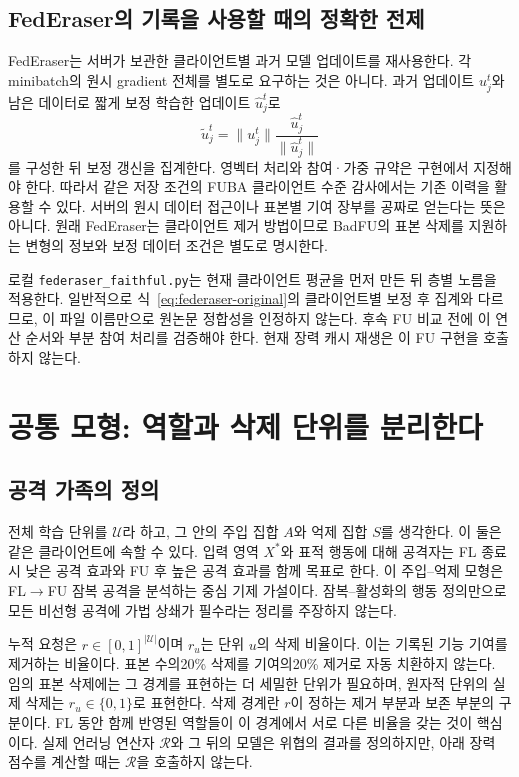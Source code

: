 \documentclass[10pt,a4paper]{article}
\begin{document}
\subsection{FedEraser의 기록을 사용할 때의 정확한 전제}
FedEraser는 서버가 보관한 클라이언트별 과거 모델 업데이트를 재사용한다\cite{federaser}.
각 minibatch의 원시 gradient 전체를 별도로 요구하는 것은 아니다.
과거 업데이트 $u_j^t$와 남은 데이터로 짧게 보정 학습한 업데이트 $\widehat u_j^t$로
\begin{equation}\label{eq:federaser-original}
 \widetilde u_j^t=\|u_j^t\|\frac{\widehat u_j^t}{\|\widehat u_j^t\|}
\end{equation}
를 구성한 뒤 보정 갱신을 집계한다. 영벡터 처리와 참여·가중 규약은 구현에서 지정해야 한다.
따라서 같은 저장 조건의 FUBA 클라이언트 수준 감사에서는 기존 이력을 활용할 수 있다.
서버의 원시 데이터 접근이나 표본별 기여 장부를 공짜로 얻는다는 뜻은 아니다.
원래 FedEraser는 클라이언트 제거 방법이므로 BadFU의 표본 삭제를 지원하는 변형의 정보와
보정 데이터 조건은 별도로 명시한다.

로컬 \texttt{federaser\_faithful.py}는 현재 클라이언트 평균을 먼저 만든 뒤 층별 노름을
적용한다. 일반적으로 식~\eqref{eq:federaser-original}의 클라이언트별 보정 후 집계와 다르므로,
이 파일 이름만으로 원논문 정합성을 인정하지 않는다. 후속 FU 비교 전에 이 연산 순서와
부분 참여 처리를 검증해야 한다. 현재 장력 캐시 재생은 이 FU 구현을 호출하지 않는다.

\section{공통 모형: 역할과 삭제 단위를 분리한다}
\subsection{공격 가족의 정의}
전체 학습 단위를 $\mathcal U$라 하고, 그 안의 주입 집합 $A$와 억제 집합 $S$를 생각한다.
이 둘은 같은 클라이언트에 속할 수 있다. 입력 영역 $X^*$와 표적 행동에 대해
공격자는 FL 종료 시 낮은 공격 효과와 FU 후 높은 공격 효과를 함께 목표로 한다.
이 주입--억제 모형은 FL$\to$FU 잠복 공격을 분석하는 중심 기제 가설이다.
잠복--활성화의 행동 정의만으로 모든 비선형 공격에 가법 상쇄가 필수라는 정리를 주장하지 않는다.

누적 요청은 $r\in[0,1]^{|\mathcal U|}$이며 $r_u$는 단위 $u$의 삭제 비율이다.
이는 기록된 기능 기여를 제거하는 비율이다. 표본 수의20\% 삭제를 기여의20\% 제거로
자동 치환하지 않는다. 임의 표본 삭제에는 그 경계를 표현하는 더 세밀한 단위가 필요하며,
원자적 단위의 실제 삭제는 $r_u\in\{0,1\}$로 표현한다.
삭제 경계란 $r$이 정하는 제거 부분과 보존 부분의 구분이다.
FL 동안 함께 반영된 역할들이 이 경계에서 서로 다른 비율을 갖는 것이 핵심이다.
실제 언러닝 연산자 $\mathcal R$와 그 뒤의 모델은 위협의 결과를 정의하지만,
아래 장력 점수를 계산할 때는 $\mathcal R$을 호출하지 않는다.
\end{document}
